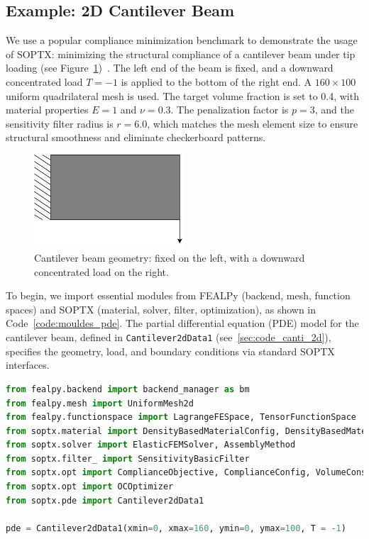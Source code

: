 \documentclass[mathpazo]{cicp}
\begin{document}
\subsection{Example: 2D Cantilever Beam}\label{sec:exp_canti_beam}
We use a popular compliance minimization benchmark to demonstrate the usage of SOPTX: minimizing the structural compliance of a cantilever beam under tip loading (see Figure~\ref{fig:cantilever})~\cite{bendsoe2013topology}. The left end of the beam is fixed, and a downward concentrated load $T = -1$ is applied to the bottom of the right end. A $160 \times 100$ uniform quadrilateral mesh is used. The target volume fraction is set to 0.4, with material properties $E = 1$ and $\nu = 0.3$. The penalization factor is $p = 3$, and the sensitivity filter radius is $r = 6.0$, which matches the mesh element size to ensure structural smoothness and eliminate checkerboard patterns.
\begin{figure}[htbp]
	\centering
	\includegraphics[width=0.5\textwidth]{figures/cantilever_2d.png}
	\caption{Cantilever beam geometry: fixed on the left, with a downward concentrated load on the right.}
	\label{fig:cantilever}
\end{figure}

To begin, we import essential modules from FEALPy (backend, mesh, function spaces) and SOPTX (material, solver, filter, optimization), as shown in Code~\ref{code:mouldes_pde}. The partial differential equation (PDE) model for the cantilever beam, defined in \texttt{Cantilever2dData1} (see~\ref{sec:code_canti_2d}), specifies the geometry, load, and boundary conditions via standard SOPTX interfaces.

\begin{lstlisting}[language=python, caption={Module imports and PDE model}, label={code:mouldes_pde}]
from fealpy.backend import backend_manager as bm
from fealpy.mesh import UniformMesh2d
from fealpy.functionspace import LagrangeFESpace, TensorFunctionSpace
from soptx.material import DensityBasedMaterialConfig, DensityBasedMaterialInstance
from soptx.solver import ElasticFEMSolver, AssemblyMethod
from soptx.filter_ import SensitivityBasicFilter
from soptx.opt import ComplianceObjective, ComplianceConfig, VolumeConstraint, VolumeConfig
from soptx.opt import OCOptimizer
from soptx.pde import Cantilever2dData1

pde = Cantilever2dData1(xmin=0, xmax=160, ymin=0, ymax=100,	T = -1)
\end{lstlisting}
\end{document}
